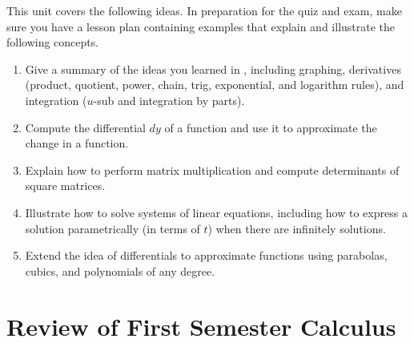 This unit covers the following ideas. In preparation for the quiz and exam, make sure you have a lesson plan containing examples that explain and illustrate the following concepts.  \begin{enumerate}
\item Give a summary of the ideas you learned in , including graphing, derivatives (product, quotient, power, chain, trig, exponential, and logarithm rules), and integration ($u$-sub and integration by parts).
\item Compute the differential $dy$ of a function and use it to approximate the change in a function. 
\item Explain how to perform matrix multiplication and compute determinants of square matrices. \\
\item Illustrate how to solve systems of linear equations, including how to express a solution parametrically (in terms of $t$) when there are infinitely solutions.
\item Extend the idea of differentials to approximate functions using parabolas, cubics, and polynomials of any degree.
\end{enumerate}

%

\section{Review of First Semester Calculus}

